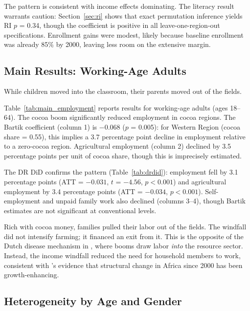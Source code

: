 \documentclass[12pt]{article}
\begin{document}
The pattern is consistent with income effects dominating. The literacy result warrants caution: Section~\ref{sec:ri} shows that exact permutation inference yields RI $p$ = 0.34, though the coefficient is positive in all leave-one-region-out specifications. Enrollment gains were modest, likely because baseline enrollment was already 85\% by 2000, leaving less room on the extensive margin.

\subsection{Main Results: Working-Age Adults}

While children moved into the classroom, their parents moved out of the fields.



Table~\ref{tab:main_employment} reports results for working-age adults (ages 18--64). The cocoa boom significantly reduced employment in cocoa regions. The Bartik coefficient (column 1) is $-0.068$ ($p$ = 0.005): for Western Region (cocoa share = 0.55), this implies a 3.7 percentage point decline in employment relative to a zero-cocoa region. Agricultural employment (column 2) declined by 3.5 percentage points per unit of cocoa share, though this is imprecisely estimated.

The DR DiD confirms the pattern (Table~\ref{tab:drdid}): employment fell by 3.1 percentage points (ATT = $-0.031$, $t$ = $-4.56$, $p < 0.001$) and agricultural employment by 3.4 percentage points (ATT = $-0.034$, $p < 0.001$). Self-employment and unpaid family work also declined (columns 3--4), though Bartik estimates are not significant at conventional levels.

Rich with cocoa money, families pulled their labor out of the fields. The windfall did not intensify farming; it financed an exit from it. This is the opposite of the Dutch disease mechanism in \citet{corden1982}, where booms draw labor \textit{into} the resource sector. Instead, the income windfall reduced the need for household members to work, consistent with \citet{mcmillan2014}'s evidence that structural change in Africa since 2000 has been growth-enhancing.

\subsection{Heterogeneity by Age and Gender}
\end{document}

